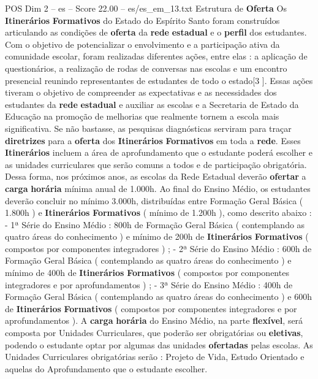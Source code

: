 \begin{textsample}{POS Dim 2 – es – Score 22.00 – es/es\_em\_13.txt}  \label{ex:f2_pos_214}
Estrutura de \textbf{Oferta} Os \textbf{Itinerários} \textbf{Formativos} do Estado do Espírito Santo foram construídos articulando as condições de \textbf{oferta} da \textbf{rede} \textbf{estadual} e o \textbf{perfil} dos estudantes.
Com o objetivo de potencializar o envolvimento e a participação ativa da comunidade escolar, foram realizadas diferentes ações, entre elas : a aplicação de questionários, a realização de rodas de conversas nas escolas e um encontro presencial reunindo representantes de estudantes de todo o estado[3 ].
Essas ações tiveram o objetivo de compreender as expectativas e as necessidades dos estudantes da \textbf{rede} \textbf{estadual} e auxiliar as escolas e a Secretaria de Estado da Educação na promoção de melhorias que realmente tornem a escola mais significativa.
Se não bastasse, as pesquisas diagnósticas serviram para traçar \textbf{diretrizes} para a \textbf{oferta} dos \textbf{Itinerários} \textbf{Formativos} em toda a \textbf{rede}.
Esses \textbf{Itinerários} incluem a área de aprofundamento que o estudante poderá escolher e as unidades curriculares que serão comuns a todos e de participação obrigatória.
Dessa forma, nos próximos anos, as escolas da Rede Estadual deverão \textbf{ofertar} a \textbf{carga} \textbf{horária} mínima anual de 1.000h.
Ao final do Ensino Médio, os estudantes deverão concluir no mínimo 3.000h, distribuídas entre Formação Geral Básica ( 1.800h ) e \textbf{Itinerários} \textbf{Formativos} ( mínimo de 1.200h ), como descrito abaixo : - 1ª Série do Ensino Médio : 800h de Formação Geral Básica ( contemplando as quatro áreas do conhecimento ) e mínimo de 200h de \textbf{Itinerários} \textbf{Formativos} ( compostos por componentes integradores ) ; - 2ª Série do Ensino Médio : 600h de Formação Geral Básica ( contemplando as quatro áreas do conhecimento ) e mínimo de 400h de \textbf{Itinerários} \textbf{Formativos} ( compostos por componentes integradores e por aprofundamentos ) ; - 3ª Série do Ensino Médio : 400h de Formação Geral Básica ( contemplando as quatro áreas do conhecimento ) e 600h de \textbf{Itinerários} \textbf{Formativos} ( compostos por componentes integradores e por aprofundamentos ).
A \textbf{carga} \textbf{horária} do Ensino Médio, na parte \textbf{flexível}, será composta por Unidades Curriculares, que poderão ser obrigatórias ou \textbf{eletivas}, podendo o estudante optar por algumas das unidades \textbf{ofertadas} pelas escolas.
As Unidades Curriculares obrigatórias serão : Projeto de Vida, Estudo Orientado e aquelas do Aprofundamento que o estudante escolher.

\end{textsample}
